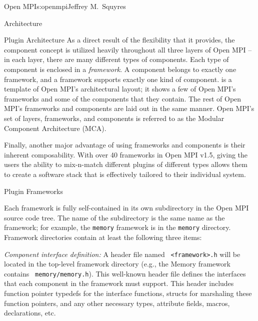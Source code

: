 \begin{aosachapter}{Open MPI}{s:openmpi}{Jeffrey M.\ Squyres}
\begin{aosasect1}{Architecture}
\begin{aosasect2}{Plugin Architecture}
As a direct result of the flexibility that it provides, the component
concept is utilized heavily throughout all three layers of Open MPI --
in each layer, there are many different types of components.
%
Each type of component is enclosed in a \emph{framework}.
%
A component belongs to exactly one framework, and a framework supports
exactly one kind of component.
%
 is a template of Open MPI's architectural
layout; it shows a few of Open MPI's frameworks and some of the
components that they contain.  The rest of Open MPI's frameworks and
components are laid out in the same manner.
%
Open MPI's set of layers, frameworks, and components is referred to as
the Modular Component Architecture (MCA).


Finally, another major advantage of using frameworks and components is
their inherent composability.  With over 40 frameworks in Open MPI
v1.5, giving the users the ability to mix-n-match different plugins of
different types allows them to create a software stack that is
effectively tailored to their individual system.

\end{aosasect2}


\begin{aosasect2}{Plugin Frameworks}

Each framework is fully self-contained in its own subdirectory in the
Open MPI source code tree.  The name of the subdirectory is the same
name as the framework; for example, the {\tt memory} framework is in
the {\tt memory} directory.  
%
Framework directories contain at least the following three items:

\begin{aosaenumerate}
\item \emph{Component interface definition:} A header file named {\tt
    <framework>.h} will be located in the top-level framework
  directory (e.g., the Memory framework contains {\tt
    memory/memory.h}).  This well-known header file defines the
  interfaces that each component in the framework must support.  This
  header includes function pointer typedefs for the interface
  functions, structs for marshaling these function pointers, and any
  other necessary types, attribute fields, macros, declarations, etc.


\end{aosaenumerate}
\end{aosasect2}
\end{aosasect1}
\end{aosachapter}

